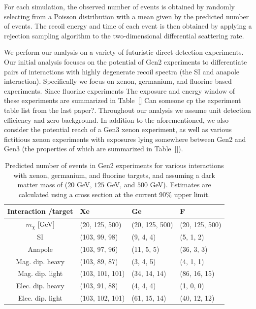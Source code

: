 \documentclass[11pt]{article}
\newcommand{\sjw}[1]{{\color{red} #1}}
\begin{document}
For each simulation, the observed number of events is obtained by randomly selecting from a Poisson distribution with a mean given by the predicted number of events. The recoil energy and time of each event is then obtained by applying a rejection sampling algorithm to the two-dimensional differential scattering rate. 

We perform our analysis on a variety of futuristic direct detection experiments. Our initial analysis focuses on the potential of Gen2 experiments to differentiate pairs of interactions with highly degenerate recoil spectra (\eg the SI and anapole interaction). Specifically we focus on xenon, germanium, and fluorine based experiments. Since fluorine experiments  The exposure and energy window of these experiments are summarized in Table~\ref{} \sjw{Can someone cp the experiment table list from the last paper?}. Throughout our analysis we assume unit detection efficiency and zero background. In addition to the aforementioned, we also consider the potential reach of a Gen3 xenon experiment, as well as various fictitious xenon experiments with exposures lying somewhere between Gen2 and Gen3 (the properties of which are summarized in Table~\ref{}).    

 

\begin{table}[t] 
\setlength{\extrarowheight}{3pt}
\setlength{\tabcolsep}{12pt}
\begin{center}
\begin{tabular}{c||m{3cm}|m{3cm}|m{3cm}}
Interaction /target & Xe & Ge & F\\
\hline\hline 
$m_\chi$ [GeV] & (20, 125, 500) & (20, 125, 500) & (20, 125, 500) \\
\hline\hline 
SI& (103, 99, 98) & (9, 4, 4)& (5, 1, 2)\\ \hline
Anapole& (103, 97, 96)& (11, 5, 5)& (36, 3, 3)\\ \hline
Mag. dip. heavy& (103, 89, 87)& (3, 4, 5)& (4, 1, 1)\\ \hline
Mag. dip. light& (103, 101, 101)& (34, 14, 14)& (86, 16, 15)\\ \hline
Elec. dip. heavy& (103, 91, 88)& (4, 4, 4)& (1, 0, 0)\\ \hline
Elec. dip. light& (103, 102, 101)& (61, 15, 14)& (40, 12, 12)\\ \hline \hline
\end{tabular}
\end{center}
\caption{Predicted number of events in Gen2 experiments for various interactions with xenon, germanium, and fluorine targets, and assuming a dark matter mass of ($20$ GeV, $125$ GeV, and $500$ GeV). Estimates are calculated using a cross section at the current 90\% upper limit.}
\label{tab:pred_events}
\end{table}
\end{document}
